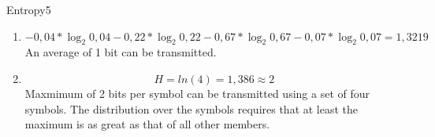 \begin{questions}
	
	\begin{question}{Entropy}{5}		
	\begin{answer} 
			\begin{enumerate}
		\item \begin{equation}
 - 0,04 * {\log_2 0,04}  - 0,22 * {\log_2 0,22} - 0,67 * {\log_2 0,67} - 0,07 * {\log_2 0,07} = 1,3219   
\end{equation}
An average of 1 bit can be transmitted.
		\item 
		\begin{equation}
		H = ln(4) = 1,386 \approx 2
		\end{equation}
		Maxmimum of 2 bits per symbol can be transmitted using a set of four symbols. 
		The distribution over the symbols requires that  at least the maximum is as great as that of all other members.
		\end{enumerate}
		
	\end{answer}
		
	\end{question}
	
\end{questions}

